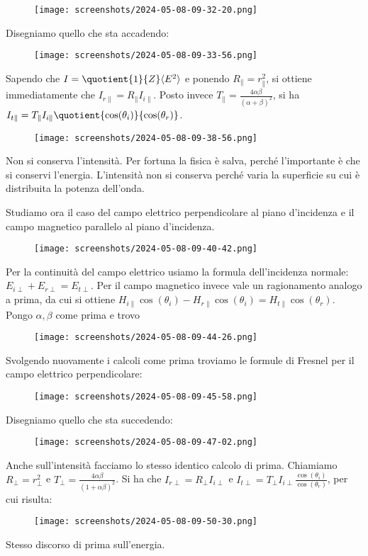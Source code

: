 \begin{figure}[H]
	\centering
	\texttt{[image: screenshots/2024-05-08-09-32-20.png]}
\end{figure}
Disegniamo quello che sta accadendo:
\begin{figure}[H]
	\centering
	\texttt{[image: screenshots/2024-05-08-09-33-56.png]}
\end{figure}
Sapendo che \(I= \quotient{1}{Z} \langle E ^{2}  \rangle \) e ponendo \(R_\parallel = r_\parallel ^{2} \), si ottiene immediatamente che \(I_{r \parallel} = R_\parallel I_{i \parallel}\). Posto invece \(T_\parallel = \frac{4 \alpha \beta }{(\alpha + \beta )^{2} }\), si ha \(I_{t \parallel} = T_\parallel I_{i \parallel} \quotient{\cos (\theta _i)}{\cos (\theta _r)} \).
\begin{figure}[H]
	\centering
	\texttt{[image: screenshots/2024-05-08-09-38-56.png]}
\end{figure}
Non si conserva l'intensità. Per fortuna la fisica è salva, perché l'importante è che si conservi l'energia. L'intensità non si conserva perché varia la superficie su cui è distribuita la potenza dell'onda.

Studiamo ora il caso del campo elettrico perpendicolare al piano d'incidenza e il campo magnetico parallelo al piano d'incidenza.
\begin{figure}[H]
	\centering
	\texttt{[image: screenshots/2024-05-08-09-40-42.png]}
\end{figure}
Per la continuità del campo elettrico usiamo la formula dell'incidenza normale: \(E_{i \perp } + E_{r \perp } = E_{t\perp } \). Per il campo magnetico invece vale un ragionamento analogo a prima, da cui si ottiene \(H_{i\parallel }\cos (\theta _i) - H_{r\parallel } \cos (\theta _i) = H_{t\parallel } \cos (\theta _r)   \). Pongo \(\alpha, \beta \) come prima e trovo
\begin{figure}[H]
	\centering
	\texttt{[image: screenshots/2024-05-08-09-44-26.png]}
\end{figure}
Svolgendo nuovamente i calcoli come prima troviamo le formule di Fresnel per il campo elettrico perpendicolare:
\begin{figure}[H]
	\centering
	\texttt{[image: screenshots/2024-05-08-09-45-58.png]}
\end{figure}
Disegniamo quello che sta succedendo:
\begin{figure}[H]
	\centering
	\texttt{[image: screenshots/2024-05-08-09-47-02.png]}
\end{figure}
Anche sull'intensità facciamo lo stesso identico calcolo di prima. Chiamiamo \(R_{\perp } = r_{\perp }^{2}   \) e \(T_{\perp } = \frac{4 \alpha \beta }{(1 + \alpha \beta )^{2} } \). Si ha che \(I_{r\perp } = R_{\perp }I_{i\perp }   \) e \(I_{t\perp }= T_{\perp }I_{i\perp } \frac{\cos (\theta _i)}{\cos (\theta_r)}  \), per cui risulta:
\begin{figure}[H]
	\centering
	\texttt{[image: screenshots/2024-05-08-09-50-30.png]}
\end{figure}
Stesso discorso di prima sull'energia.

